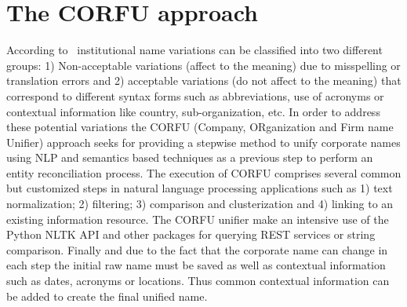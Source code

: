 \documentclass{llncs}
\begin{document}
 \section{The CORFU approach}
According to~\cite{Galvez2006,Morillo:2013:TAA:2424697.2424727} institutional name variations can be 
classified into two different groups: 1) Non-acceptable variations (affect to the meaning) due to misspelling or translation errors and 
2) acceptable variations (do not affect to the meaning) that correspond to different syntax forms such as abbreviations, use of acronyms or contextual 
information like country, sub-organization, etc. In order to address these potential variations the CORFU (Company, ORganization and Firm name Unifier) approach 
seeks for providing a stepwise method to unify corporate names using NLP and semantics based techniques as a previous step to perform 
an entity reconciliation process. The execution of CORFU comprises several common but customized steps in natural language processing applications such as 
1) text normalization; 2) filtering; 3) comparison and clusterization and 4) linking to an existing information resource. The CORFU unifier 
make an intensive use of the Python NLTK API and other packages for querying REST services or string comparison. Finally and 
due to the fact that the corporate name can change in each step the initial raw name must be saved as well as contextual information such as dates, acronyms or locations. 
Thus common contextual information can be added to create the final unified name.
\end{document}
